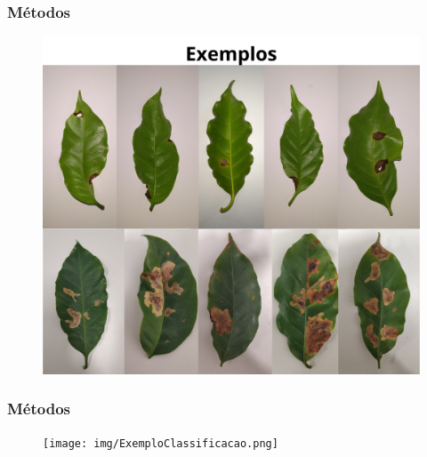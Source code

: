 \documentclass[aspectratio=169]{beamer}
\begin{document}
\begin{frame}
    \frametitle{Métodos}

    \centering
    \begin{figure}
        \centering
        \includegraphics[scale = 0.23]{img/ExemploDeteccao.png}
    \end{figure}


\end{frame}





\begin{frame}
    \frametitle{Métodos}

    \centering
    \begin{figure}
        \centering
        \texttt{[image: img/ExemploClassificacao.png]}
    \end{figure}


\end{frame}




\end{document}
